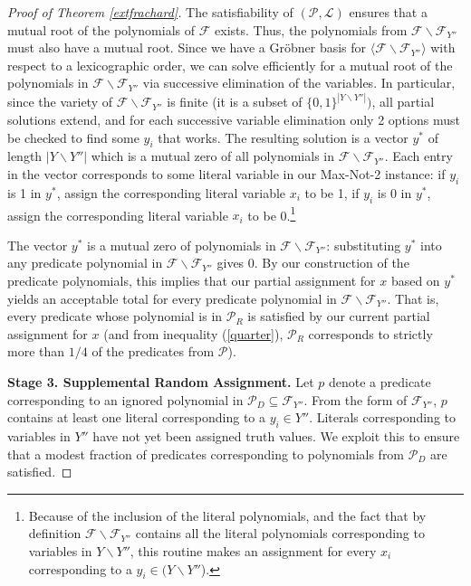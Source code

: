 \documentclass{article}
\begin{document}
\begin{proof}[Proof of Theorem \ref{extfrachard}]
The satisfiability of $(\mathcal{P}, \mathcal{L})$ ensures that a mutual root of the polynomials of $\mathcal{F}$ exists. Thus,  the polynomials from $\mathcal{F}\backslash \mathcal{F}_{Y''}$ must also have a mutual root.
Since we have a Gr\"{o}bner basis for $\langle\mathcal{F}\backslash \mathcal{F}_{Y''}\rangle$ with respect to a lexicographic order, we can solve efficiently for a mutual root of the polynomials in $\mathcal{F}\backslash \mathcal{F}_{Y''}$ via successive elimination of the variables. In particular, since the variety of $\mathcal{F}\backslash \mathcal{F}_{Y''}$ is finite (it is a subset of $\{0,1\}^{|Y\backslash Y''|})$, all partial solutions extend, and for each successive variable elimination only 2 options must be checked to find some $y_i$ that works. The resulting solution is a vector $y^*$ of length $|Y\backslash Y''|$ which is a mutual zero of all polynomials in $\mathcal{F}\backslash \mathcal{F}_{Y''}$. Each entry in the vector corresponds to some literal variable in our Max-Not-2 instance: if $y_i$ is 1 in $y^*$, assign the corresponding literal variable $x_i$ to be 1, if $y_i$ is 0 in $y^*$, assign the corresponding literal variable $x_i$ to be 0.\footnote{Because of the inclusion of the literal polynomials, and the fact that by definition $\mathcal{F}\backslash \mathcal{F}_{Y''}$ contains all the literal polynomials corresponding to variables in $Y\backslash Y''$, this routine makes an assignment for every $x_i$ corresponding to a  $y_i \in (Y\backslash Y''$).} 

The vector $y^*$ is a mutual zero of polynomials in $\mathcal{F}\backslash \mathcal{F}_{Y''}$: substituting $y^*$ into any predicate polynomial in $\mathcal{F}\backslash \mathcal{F}_{Y''}$ gives 0. By our construction of the predicate polynomials, this implies that our partial assignment for $x$ based on $y^*$ yields an acceptable total for every predicate polynomial in $\mathcal{F}\backslash \mathcal{F}_{Y''}$. That is, every predicate whose polynomial is in $\mathcal{P}_R$ is satisfied by our current partial assignment for $x$ (and from inequality (\ref{quarter}), $\mathcal{P}_R$ corresponds to strictly more than $1/4$ of the predicates from $\mathcal{P}$).

\vspace{2mm}

\noindent \textbf{Stage 3. Supplemental Random Assignment.} Let $p$ denote a
predicate corresponding to an ignored polynomial in $\mathcal{P}_D\subseteq \mathcal{F}_{Y''}$. From the form of $\mathcal{F}_{Y''}$, $p$ contains at least one literal corresponding to a $y_i\in Y''$.   
Literals corresponding to variables in $Y''$ have not yet been assigned truth values.
We exploit this to ensure that a modest fraction of predicates corresponding to polynomials from $\mathcal{P}_D$ are satisfied. 


\end{proof}
\end{document}
